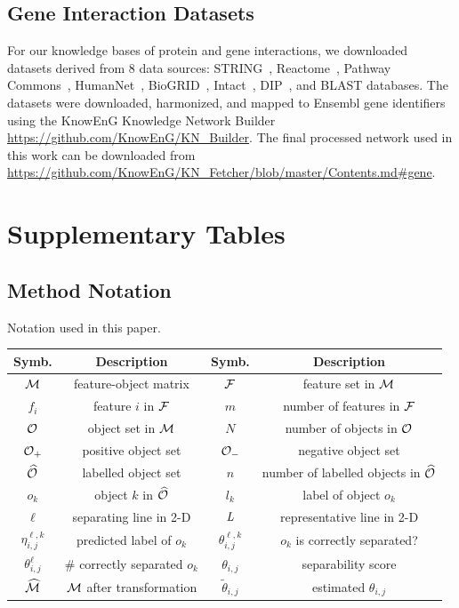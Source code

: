 \subsection{Gene Interaction Datasets} \label{app:relation_data}
For our knowledge bases of protein and gene interactions, we downloaded datasets derived from 8 data sources: STRING~, Reactome~, Pathway Commons~, HumanNet~, BioGRID~, Intact~, DIP~, and BLAST databases. The datasets were downloaded, harmonized, and mapped to Ensembl gene identifiers using the KnowEnG Knowledge Network Builder \url{https://github.com/KnowEnG/KN_Builder}. The final processed network used in this work can be downloaded from \url{https://github.com/KnowEnG/KN_Fetcher/blob/master/Contents.md#gene}.


\section{Supplementary Tables}

\subsection{\genviz Method Notation}\label{appT:notation}
Notation used in this paper.
\begin{table}[h]
\centering
\vspace{-5mm}
\small
\begin{tabular}{|c|c|c|c|}
 \hline
 Symb. & Description & Symb. & Description\\
 \hline
 \hline
 ${\mathcal{M}}$ & feature-object matrix & ${\mathcal{F}}$ & feature set in ${\mathcal{M}}$ \\
 \hline
 $f_i$ & feature $i$ in ${\mathcal{F}}$ & $m$ & number of features in ${\mathcal{F}}$\\
 \hline
 ${\mathcal{O}}$ & object set in ${\mathcal{M}}$ & $N$ & number of objects in ${\mathcal{O}}$\\
 \hline
 ${\mathcal{O}}_+$ & positive object set & ${\mathcal{O}}_-$ & negative object set\\
 \hline
 $\widehat{{\mathcal{O}}}$ & labelled object set & $n$ & number of labelled objects in $\widehat{{\mathcal{O}}}$\\
 \hline
 $o_k$ & object $k$ in $\widehat{{\mathcal{O}}}$ & $l_k$ & label of object $o_k$\\
 \hline
 $\ell$ & separating line in 2-D & $\mathit{L}$ & representative line in 2-D\\
 \hline
 $\eta_{i,j}^{\ell,k}$ & predicted label of $o_k$ & $\theta_{i,j}^{\ell,k}$ & $o_k$ is correctly separated? \\
 \hline
 $\theta_{i,j}^{\ell}$ & \# correctly separated $o_k$ & $\theta_{i,j}$ & separability score\\
 \hline
 $\widehat{{\mathcal{M}}}$ & ${\mathcal{M}}$ after transformation & $\tilde{\theta}_{i,j}$ & estimated $\theta_{i,j}$\\
 \hline
 \end{tabular}
\label{tbl:notation}
\vspace{-18pt}
\end{table}

